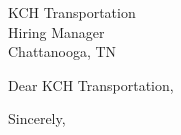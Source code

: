 \documentclass[10pt,letter]{letter}
\def\hm{KCH Transportation} %
\begin{document}
\begin{letter}{\hm \\ Hiring Manager \\ Chattanooga, TN }

\opening{Dear \hm,}

\setlength\parindent{.5in}



 

\closing{Sincerely,}
\end{letter}
\end{document}
